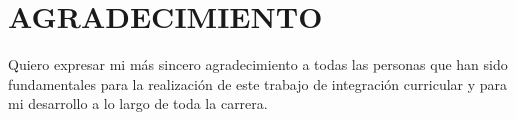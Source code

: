 \chapter*{AGRADECIMIENTO}

\justifying
Quiero expresar mi más sincero agradecimiento a todas las personas que han sido fundamentales para la realización de este trabajo de integración curricular y para mi desarrollo a lo largo de toda la carrera.
\newpage
